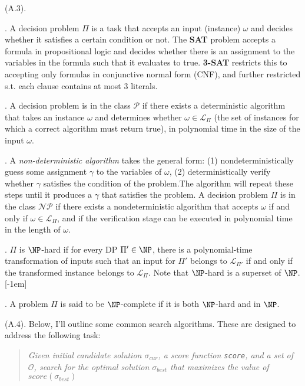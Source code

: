 \documentclass[11pt]{article}
\newcommand\myspace[1][]{\vspace{#1\bigskipamount}}
\newcommand\p{\Needspace{10\baselineskip} \noindent}
\begin{document}
\myspace 
\p {} (A.3). 
\begin{compactitem}
	\item {}. A decision problem $\Pi$ is a task that accepts an input (instance) $\omega$ and decides whether it satisfies a certain condition or not. The \textbf{SAT} problem accepts a formula in propositional logic and decides whether there is an assignment to the variables in the formula such that it evaluates to true. \textbf{3-SAT} restricts this to accepting only formulas in conjunctive normal form (CNF), and further restricted s.t. each clause contains at most 3 literals. 
	
	\item {}. A decision problem is in the class $\mathcal P$ if there exists a deterministic algorithm that takes an instance $\omega$ and determines whether $\omega \in \mathcal{L}_{\Pi}$ (the set of instances for which a correct algorithm must return true), in polynomial time in the size of the input $\omega$. 
	
	\item {}. A \textit{non-deterministic algorithm} takes the general form: (1) nondeterministically guess some assignment $\gamma$ to the variables of $\omega$, (2) deterministically verify whether $\gamma$ satisfies the condition of the problem.The algorithm will repeat these steps until it produces a $\gamma$ that satisfies the problem. A decision problem $\Pi$ is in the class $\mathcal{N}\mathcal{P}$ if there exists a nondeterministic algorithm that accepts $\omega$ if and only if $\omega \in \mathcal{L}_{\Pi}$, and if the verification stage can be executed in polynomial time in the length of $\omega$.
	
	\item {}. $\Pi$ is $\NP$-hard if for every DP $\Pi' \in \NP$, there is a polynomial-time transformation of inputs such that an input for $\Pi'$ belongs to $\mathcal{L}_{\Pi'}$ if and only if the transformed instance belongs to $\mathcal{L}_{\Pi}$. Note that $\NP$-hard is a superset of $\NP$.[-1em]
	
	\item {}. A problem $\Pi$ is said to be $\NP$-complete if it is both $\NP$-hard and in $\NP$. 
\end{compactitem}

\myspace{}
\p {} (A.4). Below, I'll outline some common search algorithms. These are designed to address the following task:
\vspace{-0.8em}
\begin{quote}
	{\itshape\small Given initial candidate solution $\sigma_{cur}$, a score function \texttt{score}, and a set of  $\mathcal{O}$, search for the optimal solution $\sigma_{best}$ that maximizes the value of $score(\sigma_{best})$}
\end{quote}
\end{document}
